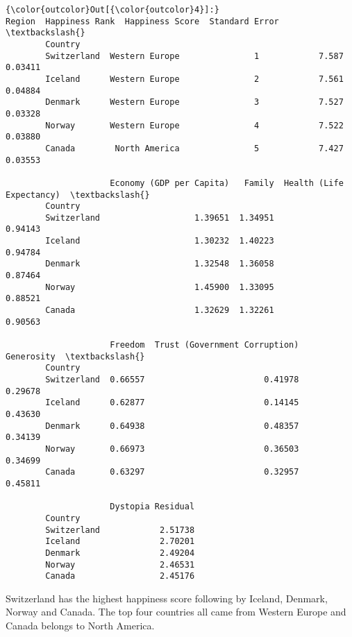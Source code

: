 \documentclass[11pt]{article}
\begin{document}
\begin{Verbatim}[commandchars=\\\{\}]
{\color{outcolor}Out[{\color{outcolor}4}]:}                      Region  Happiness Rank  Happiness Score  Standard Error  \textbackslash{}
        Country                                                                        
        Switzerland  Western Europe               1            7.587         0.03411   
        Iceland      Western Europe               2            7.561         0.04884   
        Denmark      Western Europe               3            7.527         0.03328   
        Norway       Western Europe               4            7.522         0.03880   
        Canada        North America               5            7.427         0.03553   
        
                     Economy (GDP per Capita)   Family  Health (Life Expectancy)  \textbackslash{}
        Country                                                                    
        Switzerland                   1.39651  1.34951                   0.94143   
        Iceland                       1.30232  1.40223                   0.94784   
        Denmark                       1.32548  1.36058                   0.87464   
        Norway                        1.45900  1.33095                   0.88521   
        Canada                        1.32629  1.32261                   0.90563   
        
                     Freedom  Trust (Government Corruption)  Generosity  \textbackslash{}
        Country                                                           
        Switzerland  0.66557                        0.41978     0.29678   
        Iceland      0.62877                        0.14145     0.43630   
        Denmark      0.64938                        0.48357     0.34139   
        Norway       0.66973                        0.36503     0.34699   
        Canada       0.63297                        0.32957     0.45811   
        
                     Dystopia Residual  
        Country                         
        Switzerland            2.51738  
        Iceland                2.70201  
        Denmark                2.49204  
        Norway                 2.46531  
        Canada                 2.45176  
\end{Verbatim}
            
    Switzerland has the highest happiness score following by Iceland,
Denmark, Norway and Canada. The top four countries all came from Western
Europe and Canada belongs to North America.
\end{document}
